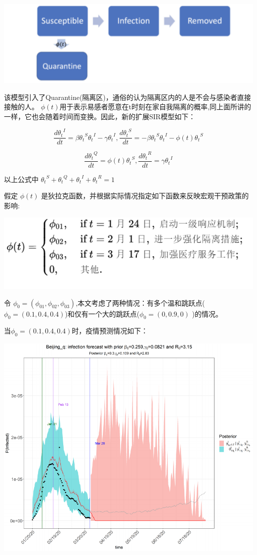 \documentclass[12pt,a5paper,]{article}
\begin{document}
\includegraphics[width=8.24in]{figures/3}

该模型引入了Quarantine(隔离区)，通俗的认为隔离区内的人是不会与感染者直接接触的人。
\(\phi(t)\)用于表示易感者愿意在t时刻在家自我隔离的概率,同上面所讲的一样，它也会随着时间而变换。因此，新的扩展SIR模型如下：

\[\frac{d{\theta_t}^I}{dt}=\beta{\theta_t}^S {\theta_t}^I -\gamma {\theta_t}^I, \frac{d{\theta_t}^S }{dt} =-\beta {\theta_t}^S {\theta_t}^I -\phi(t){\theta_t}^S\]

\[\frac{d{\theta_t}^Q}{dt}=\phi(t){\theta_t}^S,\frac{d{\theta_t}^R }{dt} = \gamma{\theta_t}^I\]

以上公式中 \({\theta_t}^S+{\theta_t}^Q+{\theta_t}^I+{\theta_t}^R=1\)

假定 \(\phi(t)\)
是狄拉克函数，并根据实际情况指定如下函数来反映宏观干预政策的影响:

\includegraphics[width=7.78in]{figures/4}

令
\(\phi_{0} =(\phi_{01},\phi_{02},\phi_{03})\),本文考虑了两种情况：有多个温和跳跃点(
\(\phi_{0}=(0.1,0.4,0.4)\))和仅有一个大的跳跃点(\(\phi_{0}=(0,0.9,0)\)
)的情况。

当\(\phi_{0}=(0.1,0.4,0.4)\)时，疫情预测情况如下：

\includegraphics[width=50in]{figures/q11}
\end{document}
